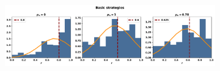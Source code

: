 \begin{figure}[!htbp]
    \par\bigskip
    \begin{subfigure}{\textwidth}
    \includegraphics[width=\textwidth]{src/chapters/07/img/normalised_rank_basic_strategies.pdf}
    \end{subfigure}
\end{figure}


\begin{table}[!htbp]
    \begin{center}
    \resizebox{.9\textwidth}{!}{
        
    }
\end{center}
\end{table}


